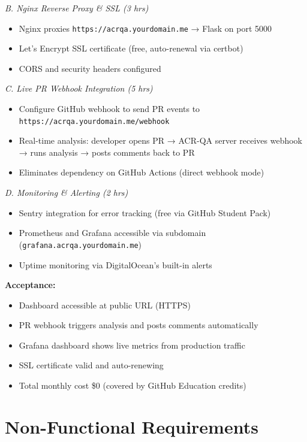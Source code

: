 \documentclass[11pt,a4paper]{article}
\begin{document}
\textit{B. Nginx Reverse Proxy \& SSL (3 hrs)}
\begin{itemize}[leftmargin=*]
    \item Nginx proxies \texttt{https://acrqa.yourdomain.me} → Flask on port 5000
    \item Let's Encrypt SSL certificate (free, auto-renewal via certbot)
    \item CORS and security headers configured
\end{itemize}

\textit{C. Live PR Webhook Integration (5 hrs)}
\begin{itemize}[leftmargin=*]
    \item Configure GitHub webhook to send PR events to \texttt{https://acrqa.yourdomain.me/webhook}
    \item Real-time analysis: developer opens PR → ACR-QA server receives webhook → runs analysis → posts comments back to PR
    \item Eliminates dependency on GitHub Actions (direct webhook mode)
\end{itemize}

\textit{D. Monitoring \& Alerting (2 hrs)}
\begin{itemize}[leftmargin=*]
    \item Sentry integration for error tracking (free via GitHub Student Pack)
    \item Prometheus and Grafana accessible via subdomain (\texttt{grafana.acrqa.yourdomain.me})
    \item Uptime monitoring via DigitalOcean's built-in alerts
\end{itemize}

\textbf{Acceptance:}
\begin{itemize}[leftmargin=*]
    \item[$\checkmark$] Dashboard accessible at public URL (HTTPS)
    \item[$\checkmark$] PR webhook triggers analysis and posts comments automatically
    \item[$\checkmark$] Grafana dashboard shows live metrics from production traffic
    \item[$\checkmark$] SSL certificate valid and auto-renewing
    \item[$\checkmark$] Total monthly cost \$0 (covered by GitHub Education credits)
\end{itemize}

\section{Non-Functional Requirements}
\end{document}
